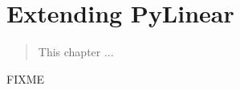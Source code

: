 \chapter{Extending PyLinear}
\label{cha:extending}

\begin{quote}
   This chapter ...
\end{quote}

FIXME
 
